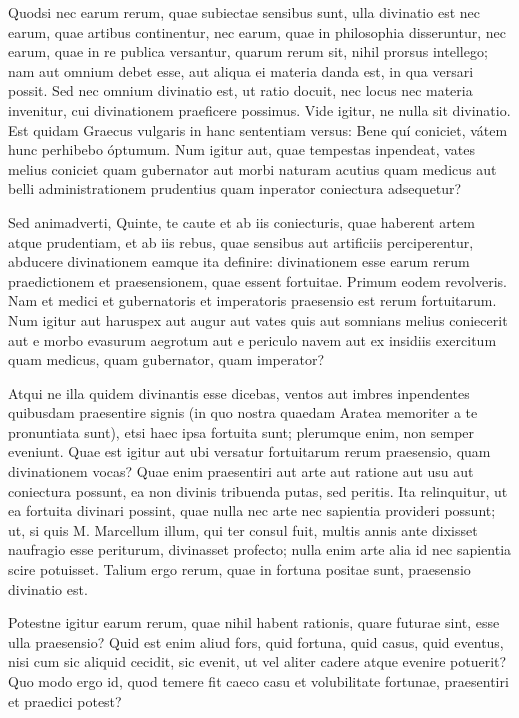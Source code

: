  Quodsi nec earum rerum, quae subiectae sensibus sunt, ulla divinatio est nec earum, quae artibus continentur, nec earum, quae in philosophia disseruntur, nec earum, quae in re publica versantur, quarum rerum sit, nihil prorsus intellego; nam aut omnium debet esse, aut aliqua ei materia danda est, in qua versari possit. Sed nec omnium divinatio est, ut ratio docuit, nec locus nec materia invenitur, cui divinationem praeficere possimus. Vide igitur, ne nulla sit divinatio. Est quidam Graecus vulgaris in hanc sententiam versus: Bene quí coniciet, vátem hunc perhibebo óptumum. Num igitur aut, quae tempestas inpendeat, vates melius coniciet quam gubernator aut morbi naturam acutius quam medicus aut belli administrationem prudentius quam inperator coniectura adsequetur?

 Sed animadverti, Quinte, te caute et ab iis coniecturis, quae haberent artem atque prudentiam, et ab iis rebus, quae sensibus aut artificiis perciperentur, abducere divinationem eamque ita definire: divinationem esse earum rerum praedictionem et praesensionem, quae essent fortuitae. Primum eodem revolveris. Nam et medici et gubernatoris et imperatoris praesensio est rerum fortuitarum. Num igitur aut haruspex aut augur aut vates quis aut somnians melius coniecerit aut e morbo evasurum aegrotum aut e periculo navem aut ex insidiis exercitum quam medicus, quam gubernator, quam imperator?

 Atqui ne illa quidem divinantis esse dicebas, ventos aut imbres inpendentes quibusdam praesentire signis (in quo nostra quaedam Aratea memoriter a te pronuntiata sunt), etsi haec ipsa fortuita sunt; plerumque enim, non semper eveniunt. Quae est igitur aut ubi versatur fortuitarum rerum praesensio, quam divinationem vocas? Quae enim praesentiri aut arte aut ratione aut usu aut coniectura possunt, ea non divinis tribuenda putas, sed peritis. Ita relinquitur, ut ea fortuita divinari possint, quae nulla nec arte nec sapientia provideri possunt; ut, si quis M. Marcellum illum, qui ter consul fuit, multis annis ante dixisset naufragio esse periturum, divinasset profecto; nulla enim arte alia id nec sapientia scire potuisset. Talium ergo rerum, quae in fortuna positae sunt, praesensio divinatio est.

 Potestne igitur earum rerum, quae nihil habent rationis, quare futurae sint, esse ulla praesensio? Quid est enim aliud fors, quid fortuna, quid casus, quid eventus, nisi cum sic aliquid cecidit, sic evenit, ut vel aliter cadere atque evenire potuerit? Quo modo ergo id, quod temere fit caeco casu et volubilitate fortunae, praesentiri et praedici potest?

